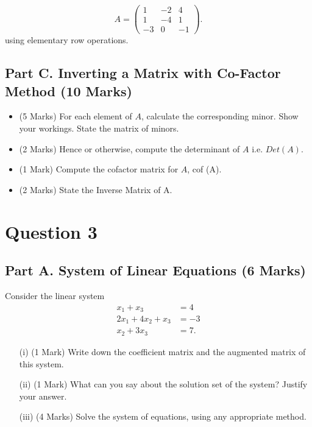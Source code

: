 \documentclass[a4paper,12pt]{article}
\begin{document}
	\begin{equation*}
	A=\left( \begin{array}{rrr}
	1 & -2 & 4\\
	1 & -4 & 1\\
	-3 & 0 & -1
	\end{array} \right).
	\end{equation*}
	using elementary row operations.
	\subsection*{Part C. Inverting a Matrix with Co-Factor Method (10
		 Marks)}		
	\begin{itemize}
		\item (5 Marks) For each element of $A$, calculate the corresponding minor. Show your workings. 
		State the matrix of minors.
		\item (2 Marks) Hence or otherwise, compute the determinant of $A$ i.e. $Det(A)$.
		\item (1 Mark) Compute the cofactor matrix for $A$, cof (A).
		\item (2 Marks) State the Inverse Matrix of A.
	\end{itemize}
\newpage
\section*{Question 3}
	\subsection*{Part A. System of Linear Equations (6 Marks)}
 Consider the linear system
		\begin{align*}
		x_1 + x_3 &= 4\\
		2x_1 + 4x_2 + x_3 &= -3\\
		x_2 + 3x_3 &= 7.
		\end{align*}
		\begin{itemize}
			\item[(i)] (1 Mark) Write down the coefficient matrix and the augmented matrix of this system. %
			
			\item[(ii)] (1 Mark) What can you say about the solution set of the system? Justify your answer. %
			
			\item[(iii)] (4 Marks) Solve the system of equations, using any appropriate method. %
		\end{itemize}
\end{document}

